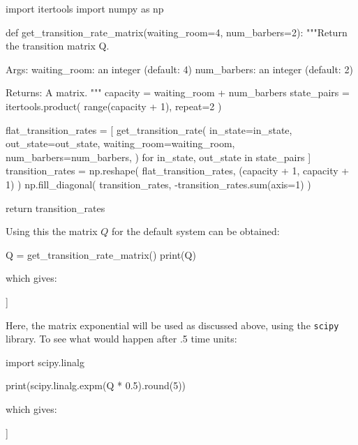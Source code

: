 \begin{pyin}
import itertools
import numpy as np


def get_transition_rate_matrix(waiting_room=4, num_barbers=2):
    """Return the transition matrix Q.

    Args:
        waiting_room: an integer (default: 4)
        num_barbers: an integer (default: 2)

    Returns:
        A matrix.
    """
    capacity = waiting_room + num_barbers
    state_pairs = itertools.product(
        range(capacity + 1), repeat=2
    )

    flat_transition_rates = [
        get_transition_rate(
            in_state=in_state,
            out_state=out_state,
            waiting_room=waiting_room,
            num_barbers=num_barbers,
        )
        for in_state, out_state in state_pairs
    ]
    transition_rates = np.reshape(
        flat_transition_rates, (capacity + 1, capacity + 1)
    )
    np.fill_diagonal(
        transition_rates, -transition_rates.sum(axis=1)
    )

    return transition_rates
\end{pyin}

Using this the matrix \(Q\) for the default system can be obtained:

\begin{pyin}
Q = get_transition_rate_matrix()
print(Q)
\end{pyin}

which gives:

\begin{pyout}
[[-10  10   0   0   0   0   0]
 [  4 -14  10   0   0   0   0]
 [  0   8 -18  10   0   0   0]
 [  0   0   8 -18  10   0   0]
 [  0   0   0   8 -18  10   0]
 [  0   0   0   0   8 -18  10]
 [  0   0   0   0   0   8  -8]]
\end{pyout}

Here, the matrix exponential will be used as
discussed above, using the \texttt{scipy}
library. To see what would happen after .5 time units:

\begin{pyin}
import scipy.linalg

print(scipy.linalg.expm(Q * 0.5).round(5))
\end{pyin}

which gives:

\begin{pyout}
[[0.10492 0.21254 0.20377 0.17142 0.13021 0.09564 0.0815 ]
 [0.08501 0.18292 0.18666 0.1708  0.14377 0.1189  0.11194]
 [0.06521 0.14933 0.16338 0.16478 0.15633 0.14751 0.15346]
 [0.04388 0.10931 0.13183 0.15181 0.16777 0.18398 0.21142]
 [0.02667 0.07361 0.10005 0.13422 0.17393 0.2189  0.27262]
 [0.01567 0.0487  0.07552 0.11775 0.17512 0.24484 0.32239]
 [0.01068 0.03668 0.06286 0.10824 0.17448 0.25791 0.34914]]
\end{pyout}

